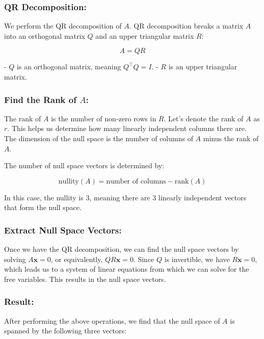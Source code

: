 \documentclass{article}
\begin{document}
\subsubsection{QR Decomposition:}

We perform the QR decomposition of \( A \). QR decomposition breaks a matrix \( A \) into an orthogonal matrix \( Q \) and an upper triangular matrix \( R \):

\[
A = QR
\]

- \( Q \) is an orthogonal matrix, meaning \( Q^\top Q = I \).
- \( R \) is an upper triangular matrix.

\subsubsection{Find the Rank of \( A \):}

The rank of \( A \) is the number of non-zero rows in \( R \). Let's denote the rank of \( A \) as \( r \). This helps us determine how many linearly independent columns there are. The dimension of the null space is the number of columns of \( A \) minus the rank of \( A \).

The number of null space vectors is determined by:

\[
\text{nullity}(A) = \text{number of columns} - \text{rank}(A)
\]

In this case, the nullity is 3, meaning there are 3 linearly independent vectors that form the null space.

\subsubsection{Extract Null Space Vectors:}
Once we have the QR decomposition, we can find the null space vectors by solving \( A \mathbf{x} = 0 \), or equivalently, \( QR \mathbf{x} = 0 \). Since \( Q \) is invertible, we have \( R \mathbf{x} = 0 \), which leads us to a system of linear equations from which we can solve for the free variables. This results in the null space vectors.

\subsubsection{Result:}
After performing the above operations, we find that the null space of \( A \) is spanned by the following three vectors:
\end{document}
